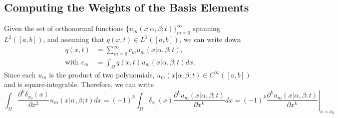 \documentclass[10pt]{article}
\begin{document}
\subsection{Computing the Weights of the Basis Elements}
Given the set of orthonormal functions
$\{u_m(x|\alpha,\beta;t)\}_{m=0}^\infty$ spanning $L^2([a,b])$, and
assuming that $q(x,t) \in L^2([a,b])$, we can write down
\begin{align*}
   q(x,t) &= \sum_{m=0}^\infty c_m u_m(x|\alpha,\beta;t), \\
  \mbox{with  } c_m &= \int_\Omega q(x,t) u_m(x|\alpha,\beta;t) dx.
\end{align*}
Since each $u_m$ is the product of two polynomials,
$u_m(x|\alpha,\beta;t) \in C^{\infty}([a,b])$ and is
square-integrable. Therefore, we can write
\begin{equation}
  \int_\Omega \frac{\partial^k \delta_{x_0}(x)}{\partial x^2}
  u_m(x|\alpha,\beta;t) dx = (-1)^{k} \int_\Omega \delta_{x_0}(x)
  \frac{\partial^k u_m(x|\alpha,\beta;t)}{\partial x^k} dx = (-1)^k
  \left. \frac{\partial^k u_m(x|\alpha,\beta;t)}{\partial x^k}
  \right|_{x=x_0}
\end{equation}


% 

\end{document}
